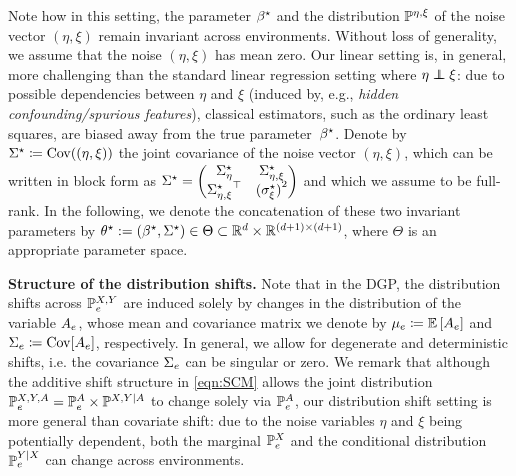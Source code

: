 Note how in this setting, the parameter $\beta^{\star}$ and the distribution $\mathbb{P}^{\eta,\xi}$ of the noise vector $(\eta,\xi)$ remain invariant across environments. Without loss of generality, we assume that the noise $(\eta,\xi)$ has mean zero. Our linear setting
is, in general, more challenging than the standard linear regression setting where $\eta \independent \xi$: due to possible dependencies between $\eta$ and $\xi$ (induced by, e.g., \emph{hidden confounding/spurious features}), classical estimators, such as the ordinary least squares, are biased away from the true parameter~$\beta^{\star}$. 
Denote by $\Sigma^{\star} \coloneqq \mathrm{Cov}((\eta,\xi))$ the joint covariance of the noise vector $(\eta,\xi)$, which can be written in block form as  $\Sigma^{\star} = \begin{pmatrix}\Sigma^\star_{\eta}& \Sigma^\star_{\eta,\xi}\\{\Sigma^\star_{\eta,\xi}}^\top&{(\sigma_\xi^\star)}^2\end{pmatrix}$ and which we assume to be full-rank. In the following, we denote the concatenation of these two invariant parameters by $\theta^{\star} := (\beta^{\star}, \Sigma^{\star}) \in \Theta \subset  \mathbb{R}^{d}\times \mathbb{R}^{(d+1)\times(d+1)}$, where $\Theta$ is an appropriate parameter space. 

\textbf{Structure of the distribution shifts.}
Note that in the DGP, the distribution shifts across $\mathbb{P}_e^{X,Y}$ are induced solely by changes in the distribution of the variable $A_e$, whose mean and covariance matrix we denote by $\mu_e \coloneqq \mathbb{E}\,[A_e]$ and $\Sigma_e \coloneqq\mathrm{Cov} [A_e]$, respectively. 
In general, we allow for degenerate and deterministic shifts, i.e. the covariance $\Sigma_e$ can be singular or zero.  We remark that although the additive shift structure in \cref{eqn:SCM} allows the joint distribution $\mathbb{P}_e^{X,Y,A}= \mathbb{P}^{A}_{e} \times \mathbb{P}^{X,Y | A}$ to change solely via $\mathbb{P}^{A}_{e}$, our distribution shift setting is more general than covariate shift: due to the noise variables $\eta$ and $\xi$ being potentially dependent, both the marginal $\mathbb{P}_e^{X}$ and the conditional distribution $\mathbb{P}^{Y | X}_e$ can change across environments. %

